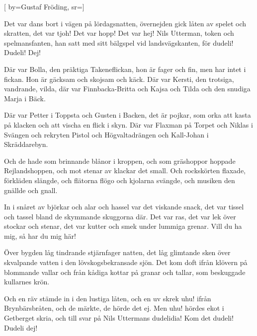 


[ 	%
	by={Gustaf Fröding},	%
	sr={}]		%
	
\beginverse*		%
Det var dans bort i vägen på lördagsnatten, 
övernejden gick låten av spelet och skratten,
det var tjoh! Det var hopp! Det var hej!
Nils Utterman, token och spelmansfanten,
han satt med sitt bälgspel vid landsvägskanten,
för dudeli! Dudeli! Dej! 
\endverse			%

\beginverse*		%
Där var Bolla, den präktiga Takeneflickan,
hon är fager och fin, men har intet i fickan.
Hon är gäcksam och skojsam och käck.
Där var Kersti, den trotsiga, vandrande, vilda, 
där var Finnbacka-Britta och Kajsa och Tilda
och den snudiga Marja i Bäck.
\endverse			%

\beginverse*		%
Där var Petter i Toppsta och Gusten i Backen,
det är pojkar, som orka att kasta på klacken
och att vischa en flick i skyn. 
Där var Flaxman på Torpet och Niklas i Svängen
och rekryten Pistol och Högvaltadrängen
och Kall-Johan i Skräddarebyn. 
\endverse			%

\beginverse*		%
Och de hade som brinnande blånor i kroppen,
och som gräshoppor hoppade Rejlandshoppen,
och mot stenar av klackar det small.
Och rockskörten flaxade, förkläden slängde,
och flätorna flögo och kjolarna svängde,
och musiken den gnällde och gnall. 
\endverse			%

\beginverse*		%
In i snåret av björkar och alar och hassel
var det viskande snack, det var tissel och tassel
bland de skymmande skuggorna där.
Det var ras, det var lek över stockar och stenar,
det var kutter och smek under lummiga grenar.
Vill du ha mig, så har du mig här! 
\endverse			%

\beginverse*		%
Över bygden låg tindrande stjärnfager natten,
det låg glimtande sken över skvalpande vatten
i den lövskogsbekransade sjön.
Det kom doft ifrån klövern på blommande vallar
och från kådiga kottar på granar och tallar,
som beskuggade kullarnes krön. 
\endverse			%

\beginverse*		%
Och en räv stämde in i den lustiga låten,
och en uv skrek uhu! ifrån Brynbärsbråten,
och de märkte, de hörde det ej.
Men uhu! hördes ekot i Getberget skria,
och till svar på Nils Uttermans dudelidia!
Kom det dudeli! Dudeli dej!
\endverse			%
\endsong			%
